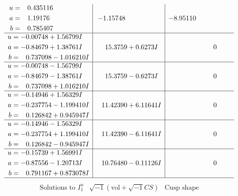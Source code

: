 \documentclass[1p]{elsarticle_modified}
\theoremstyle{definition}
\newcommand{\I}{\sqrt{-1}}
\begin{document}
$$\begin{array}{c|c|c}
\begin{aligned}
u &= \phantom{-}0.435116\phantom{ +0.000000I} \\
a &= \phantom{-}1.19176\phantom{ +0.000000I} \\
b &= \phantom{-}0.785407\phantom{ +0.000000I}\end{aligned}
 & -1.15748\phantom{ +0.000000I} & -8.95110\phantom{ +0.000000I} \\ \hline\begin{aligned}
u &= -0.00748 + 1.56799 I \\
a &= -0.84679 + 1.38761 I \\
b &= \phantom{-}0.737098 - 1.016210 I\end{aligned}
 & \phantom{-}15.3759 + 0.6273 I & \phantom{-0.000000 } 0 \\ \hline\begin{aligned}
u &= -0.00748 - 1.56799 I \\
a &= -0.84679 - 1.38761 I \\
b &= \phantom{-}0.737098 + 1.016210 I\end{aligned}
 & \phantom{-}15.3759 - 0.6273 I & \phantom{-0.000000 } 0 \\ \hline\begin{aligned}
u &= -0.14946 + 1.56329 I \\
a &= -0.237754 - 1.199410 I \\
b &= \phantom{-}0.126842 + 0.945947 I\end{aligned}
 & \phantom{-}11.42390 + 6.11641 I & \phantom{-0.000000 } 0 \\ \hline\begin{aligned}
u &= -0.14946 - 1.56329 I \\
a &= -0.237754 + 1.199410 I \\
b &= \phantom{-}0.126842 - 0.945947 I\end{aligned}
 & \phantom{-}11.42390 - 6.11641 I & \phantom{-0.000000 } 0 \\ \hline\begin{aligned}
u &= -0.15739 + 1.56991 I \\
a &= -0.87556 - 1.20713 I \\
b &= \phantom{-}0.791167 + 0.873078 I\end{aligned}
 & \phantom{-}10.76480 - 0.11126 I & \phantom{-0.000000 } 0\\
 \hline 
 \end{array}$$\newpage$$\begin{array}{c|c|c}  
\text{Solutions to }I^u_{1}& \I (\text{vol} + \sqrt{-1}CS) & \text{Cusp shape}\\

\end{array}$$
\end{document}
